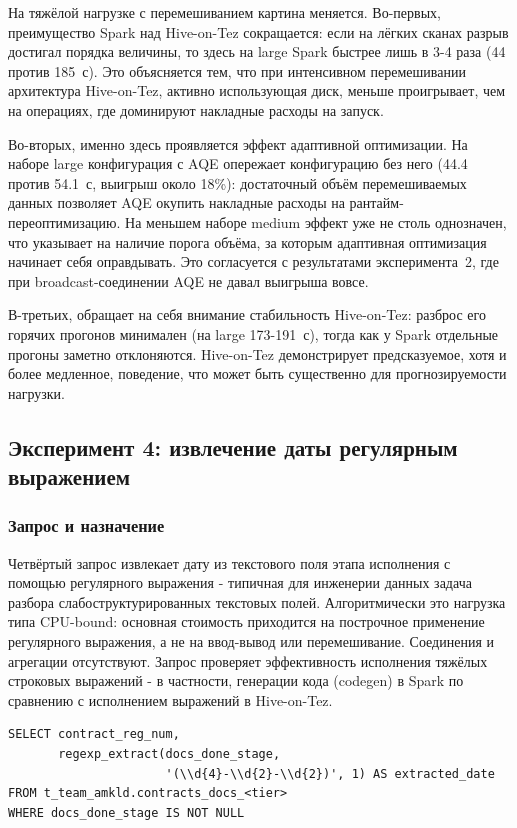\documentclass[12pt,letterpaper, onecolumn]{exam}
\begin{document}
На тяжёлой нагрузке с перемешиванием картина меняется. Во-первых,
преимущество Spark над Hive-on-Tez сокращается: если на лёгких сканах разрыв
достигал порядка величины, то здесь на large Spark быстрее лишь в 3-4 раза
(44 против 185~с). Это объясняется тем, что при интенсивном перемешивании
архитектура Hive-on-Tez, активно использующая диск, меньше проигрывает, чем на
операциях, где доминируют накладные расходы на запуск.

Во-вторых, именно здесь проявляется эффект адаптивной оптимизации. На наборе
large конфигурация с AQE опережает конфигурацию без него (44.4 против 54.1~с,
выигрыш около 18\%): достаточный объём перемешиваемых данных позволяет AQE
окупить накладные расходы на рантайм-переоптимизацию. На меньшем наборе medium
эффект уже не столь однозначен, что указывает на наличие порога объёма, за
которым адаптивная оптимизация начинает себя оправдывать. Это согласуется с
результатами эксперимента~2, где при broadcast-соединении AQE не давал
выигрыша вовсе.

В-третьих, обращает на себя внимание стабильность Hive-on-Tez: разброс его
горячих прогонов минимален (на large 173-191~с), тогда как у Spark отдельные
прогоны заметно отклоняются. Hive-on-Tez демонстрирует предсказуемое, хотя и
более медленное, поведение, что может быть существенно для прогнозируемости
нагрузки.

\subsection{Эксперимент 4: извлечение даты регулярным выражением}

\subsubsection{Запрос и назначение}
Четвёртый запрос извлекает дату из текстового поля этапа исполнения с помощью
регулярного выражения - типичная для инженерии данных задача разбора
слабоструктурированных текстовых полей. Алгоритмически это нагрузка типа
CPU-bound: основная стоимость приходится на построчное применение регулярного
выражения, а не на ввод-вывод или перемешивание. Соединения и агрегации
отсутствуют. Запрос проверяет эффективность исполнения тяжёлых строковых
выражений - в частности, генерации кода (codegen) в Spark по сравнению с
исполнением выражений в Hive-on-Tez.

\begin{lstlisting}[style=sparkconf, caption={Эксперимент 4}, label={lst:q4}]
SELECT contract_reg_num,
       regexp_extract(docs_done_stage,
                      '(\\d{4}-\\d{2}-\\d{2})', 1) AS extracted_date
FROM t_team_amkld.contracts_docs_<tier>
WHERE docs_done_stage IS NOT NULL
\end{lstlisting}
\end{document}
